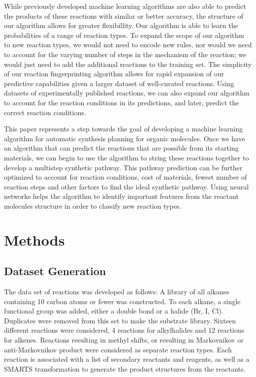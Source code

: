 While previously developed machine learning algorithms are also able to predict the products of these reactions with similar or better accuracy\cite{Kayala_2012}, the structure of our algorithm allows for greater flexibillity. Our algorithm is able to learn the probabilities of a range of reaction types. To expand the scope of our algorithm to new reaction types, we would not need to encode new rules, nor would we need to account for the varying number of steps in the mechanism of the reaction; we would just need to add the additional reactions to the training set. The simplicity of our reaction fingerprinting algorithm allows for rapid expansion of our predictive capabilities given a larger dataset of well-curated reactions\cite{Szymkuc_2016,ChemPlanner}. Using datasets of experimentally published reactions, we can also expand our algorithm to account for the reaction conditions in its predictions, and later, predict the correct reaction conditions.

This paper represents a step towards the goal of developing a machine learning algorithm for automatic synthesis planning for organic molecules. Once we have an algorithm that can predict the reactions that are possible from its starting materials, we can begin to use the algorithm to string these reactions together to develop a multistep synthetic pathway. This pathway prediction can be further optimized to account for reaction conditions, cost of materials, fewest number of reaction steps and other factors to find the ideal synthetic pathway. Using neural networks helps the algorithm to identify important features from the reactant molecules structure in order to classify new reaction types.


\section{Methods}

\subsection{ Dataset Generation  }

The data set of reactions was developed as follows: A library of all alkanes containing 10 carbon atoms or fewer was constructed. To each alkane, a single functional group was added, either a double bond or a halide (Br, I, Cl). Duplicates were removed from this set to make the substrate library. Sixteen different reactions were considered, 4 reactions for alkylhalides and 12 reactions for alkenes. Reactions resulting in methyl shifts, or resulting in Markovnikov or anti-Markovnikov product were considered as separate reaction types. Each reaction is associated with a list of secondary reactants and reagents, as well as a SMARTS transformation to generate the product structures from the reactants. 

